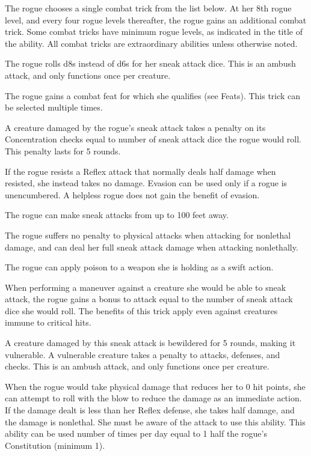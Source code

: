 The rogue chooses a single combat trick from the list below. At her 8th rogue level, and every four rogue levels thereafter, the rogue gains an additional combat trick. Some combat tricks have minimum rogue levels, as indicated in the title of the ability. All combat tricks are extraordinary abilities unless otherwise noted.

 The rogue rolls d8s instead of d6s for her sneak attack dice. This is an ambush attack, and only functions once per creature.

 The rogue gains a combat feat for which she qualifies (see Feats). This trick can be selected multiple times.

 A creature damaged by the rogue's sneak attack takes a penalty on its Concentration checks equal to number of sneak attack dice the rogue would roll. This penalty lasts for 5 rounds.

 If the rogue resists a Reflex attack that normally deals half damage when resisted, she instead takes no damage. Evasion can be used only if a rogue is unencumbered. A helpless rogue does not gain the benefit of evasion.

 The rogue can make sneak attacks from up to 100 feet away.

 The rogue suffers no penalty to physical attacks when attacking for nonlethal damage, and can deal her full sneak attack damage when attacking nonlethally.

 The rogue can apply poison to a weapon she is holding as a swift action.

 When performing a maneuver against a creature she would be able to sneak attack, the rogue gains a bonus to attack equal to the number of sneak attack dice she would roll. The benefits of this trick apply even against creatures immune to critical hits.

 A creature damaged by this sneak attack is bewildered for 5 rounds, making it vulnerable. A vulnerable creature takes a  penalty to attacks, defenses, and checks. This is an ambush attack, and only functions once per creature.

 When the rogue would take physical damage that reduces her to 0 hit points, she can attempt to roll with the blow to reduce the damage as an immediate action. If the damage dealt is less than her Reflex defense, she takes half damage, and the damage is nonlethal. She must be aware of the attack to use this ability. This ability can be used number of times per day equal to 1 \add half the rogue's Constitution (minimum 1).

